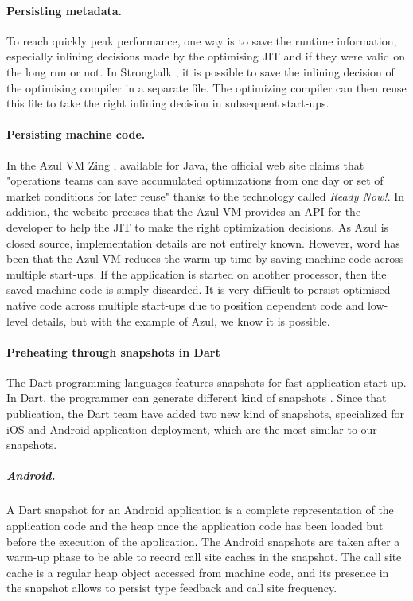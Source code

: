 \documentclass[a4paper,12pt,twoside]{../includes/ThesisStyle}
\begin{document}
\paragraph{Persisting metadata.}

To reach quickly peak performance, one way is to save the runtime information, especially inlining decisions made by the optimising JIT and if they were valid on the long run or not. In Strongtalk \cite{Sun06}, it is possible to save the inlining decision of the optimising compiler in a separate file. The optimizing compiler can then reuse this file to take the right inlining decision in subsequent start-ups.

\paragraph{Persisting machine code.}

In the Azul VM Zing \cite{Azul}, available for Java, the official web site claims that "operations teams can save accumulated optimizations from one day or set of market conditions for later reuse" thanks to the technology called \emph{Ready Now!}. In addition, the website precises that the Azul VM provides an API for the developer to help the JIT to make the right optimization decisions. As Azul is closed source, implementation details are not entirely known. However, word has been that the Azul VM reduces the warm-up time by saving machine code across multiple start-ups. If the application is started on another processor, then the saved machine code is simply discarded. It is very difficult to persist optimised native code across multiple start-ups due to position dependent code and low-level details, but with the example of Azul, we know it is possible.

\paragraph{Preheating through snapshots in Dart}

The Dart programming languages features snapshots for fast application start-up. In Dart, the programmer can generate different kind of snapshots \cite{Anna13a}. Since that publication, the Dart team have added two new kind of snapshots, specialized for iOS and Android application deployment, which are the most similar to our snapshots.

\subparagraph{Android.} A Dart snapshot for an Android application is a complete representation of the application code and the heap once the application code has been loaded but before the execution of the application. The Android snapshots are taken after a warm-up phase to be able to record call site caches in the snapshot. The call site cache is a regular heap object accessed from machine code, and its presence in the snapshot allows to persist type feedback and call site frequency.
\end{document}
